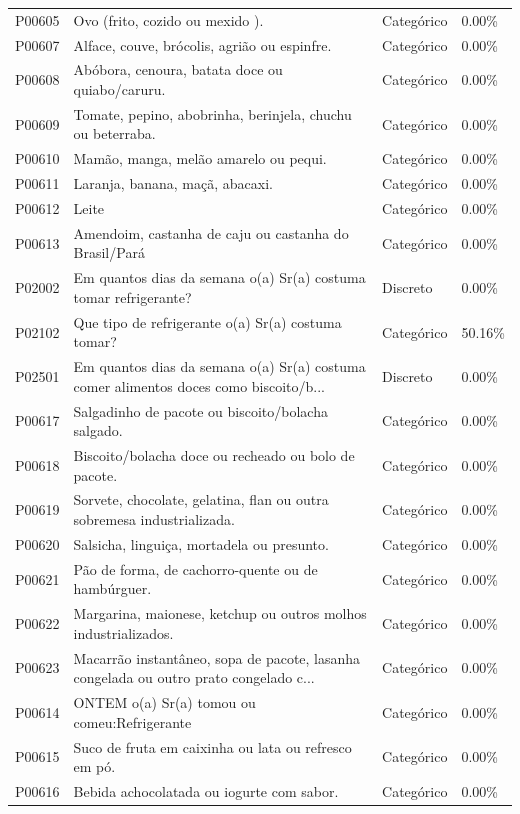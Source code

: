 \documentclass[12pt, a4paper]{article}
\begin{document}
\begin{longtable}{p{2.5cm} p{7.5cm} p{2.5cm} p{2.5cm}}
P00605 & Ovo (frito, cozido ou mexido ). & Categórico & 0.00\% \\
P00607 & Alface, couve, brócolis, agrião ou espinfre. & Categórico & 0.00\% \\
P00608 & Abóbora, cenoura, batata doce ou quiabo/caruru. & Categórico & 0.00\% \\
P00609 & Tomate, pepino, abobrinha, berinjela, chuchu ou beterraba. & Categórico & 0.00\% \\
P00610 & Mamão, manga, melão amarelo ou pequi. & Categórico & 0.00\% \\
P00611 & Laranja, banana, maçã, abacaxi. & Categórico & 0.00\% \\
P00612 & Leite & Categórico & 0.00\% \\
P00613 & Amendoim, castanha de caju ou castanha do Brasil/Pará & Categórico & 0.00\% \\
P02002 & Em quantos dias da semana o(a) Sr(a) costuma tomar refrigerante? & Discreto & 0.00\% \\
P02102 & Que tipo de refrigerante o(a) Sr(a) costuma tomar? & Categórico & 50.16\% \\
P02501 & Em quantos dias da semana o(a) Sr(a) costuma comer alimentos doces como biscoito/b... & Discreto & 0.00\% \\
P00617 & Salgadinho de pacote ou biscoito/bolacha salgado. & Categórico & 0.00\% \\
P00618 & Biscoito/bolacha doce ou recheado ou bolo de pacote. & Categórico & 0.00\% \\
P00619 & Sorvete, chocolate, gelatina, flan ou outra sobremesa industrializada. & Categórico & 0.00\% \\
P00620 & Salsicha, linguiça, mortadela ou presunto. & Categórico & 0.00\% \\
P00621 & Pão de forma, de cachorro-quente ou de hambúrguer. & Categórico & 0.00\% \\
P00622 & Margarina, maionese, ketchup ou outros molhos industrializados. & Categórico & 0.00\% \\
P00623 & Macarrão instantâneo, sopa de pacote, lasanha congelada ou outro prato congelado c... & Categórico & 0.00\% \\
P00614 & ONTEM o(a) Sr(a) tomou ou comeu:Refrigerante & Categórico & 0.00\% \\
P00615 & Suco de fruta em caixinha ou lata ou refresco em pó. & Categórico & 0.00\% \\
P00616 & Bebida achocolatada ou iogurte com sabor. & Categórico & 0.00\% \\

\end{longtable}
\end{document}
